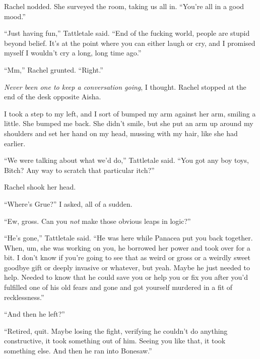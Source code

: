 Rachel nodded.  She surveyed the room, taking us all in.  ``You're all in a good mood.''



``Just having fun,'' Tattletale said.  ``End of the fucking world, people are stupid beyond belief.  It's at the point where you can either laugh or cry, and I promised myself I wouldn't cry a long, long time ago.''



``Mm,'' Rachel grunted.  ``Right.''



\emph{Never been one to keep a conversation going}, I thought.  Rachel stopped at the end of the desk opposite Aisha.



I took a step to my left, and I sort of bumped my arm against her arm, smiling a little.  She bumped me back.  She didn't smile, but she put an arm up around my shoulders and set her hand on my head, mussing with my hair, like she had earlier.



``We were talking about what we'd do,'' Tattletale said.  ``You got any boy toys, Bitch?  Any way to scratch that particular itch?''



Rachel shook her head.



``Where's Grue?''  I asked, all of a sudden.



``Ew, gross.  Can you \emph{not} make those obvious leaps in logic?''



``He's gone,'' Tattletale said.  ``He was here while Panacea put you back together.  When, um, she was working on you, he borrowed her power and took over for a bit.  I don't know if you're going to see that as weird or gross or a weirdly sweet goodbye gift or deeply invasive or whatever, but yeah.  Maybe he just needed to help.  Needed to know that he could save you or help you or fix you after you'd fulfilled one of his old fears and gone and got yourself murdered in a fit of recklessness.''



``And then he left?''



``Retired, quit.  Maybe losing the fight, verifying he couldn't do anything constructive, it took something out of him.  Seeing you like that, it took something else.  And then he ran into Bonesaw.''



